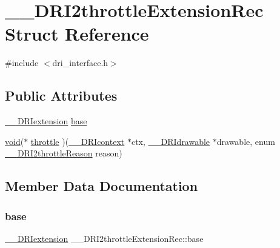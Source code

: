 \hypertarget{struct_____d_r_i2throttle_extension_rec}{}\section{\+\_\+\+\_\+\+D\+R\+I2throttle\+Extension\+Rec Struct Reference}
\label{struct_____d_r_i2throttle_extension_rec}


{\ttfamily \#include $<$dri\+\_\+interface.\+h$>$}

\subsection*{Public Attributes}
\begin{DoxyCompactItemize}
\item 
\hyperlink{dri__interface_8h_a4e0a61c8ece00d2b2c6792a9a1b55385}{\+\_\+\+\_\+\+D\+R\+Iextension} \hyperlink{struct_____d_r_i2throttle_extension_rec_a17a537fe633d9b6ac1194290382a76b3}{base}
\item 
\hyperlink{_s_d_l__opengles2__gl2ext_8h_ae5d8fa23ad07c48bb609509eae494c95}{void}($\ast$ \hyperlink{struct_____d_r_i2throttle_extension_rec_aa98e6b8ca261dd0d14eb9713c18c88bf}{throttle} )(\hyperlink{dri__interface_8h_a3fd295cba82b5a3d79f1ee7e12bfb908}{\+\_\+\+\_\+\+D\+R\+Icontext} $\ast$ctx, \hyperlink{dri__interface_8h_a5bfb832a0a08208d95b3bbef439d2262}{\+\_\+\+\_\+\+D\+R\+Idrawable} $\ast$drawable, enum \hyperlink{dri__interface_8h_a195f4ef9181a99d4aae51c5ba5ee32aa}{\+\_\+\+\_\+\+D\+R\+I2throttle\+Reason} reason)
\end{DoxyCompactItemize}


\subsection{Member Data Documentation}
\mbox{\label{struct_____d_r_i2throttle_extension_rec_a17a537fe633d9b6ac1194290382a76b3}} 
\subsubsection{\texorpdfstring{base}{base}}
{\footnotesize\ttfamily \hyperlink{dri__interface_8h_a4e0a61c8ece00d2b2c6792a9a1b55385}{\+\_\+\+\_\+\+D\+R\+Iextension} \+\_\+\+\_\+\+D\+R\+I2throttle\+Extension\+Rec\+::base}

